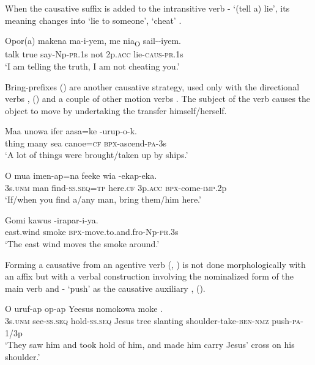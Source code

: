 When the causative suffix is added to the intransitive verb - `(tell a) lie', its meaning changes into `lie to someone', `cheat' . 

\ea%
\label{ex:3:x448}
\gll Opor(a) makena ma-i-yem, me {\ob}nia{\cb}\textsubscript{O} sail--iyem. \\
talk true say-Np-\textsc{pr}.1s not 2p.\textsc{acc} lie-\textsc{caus}-\textsc{pr}.1s\\
\glt`I am telling the truth, I am not cheating you.'
\z

Bring-prefixes () are another causative strategy, used only with the directional verbs ,  () and a couple of other motion verbs . The subject of the verb causes the object to move by undertaking the transfer himself/herself.

\ea%
\label{ex:3:x999}
\gll Maa unowa ifer aasa=ke -urup-o-k. \\
thing many sea canoe=\textsc{cf} \textsc{bpx}-ascend-\textsc{pa}-3s\\
\glt`A lot of things were brought/taken up by ships.'
\z

\ea%
\label{ex:3:x1001}
\gll O mua imen-ap=na feeke wia -ekap-eka. \\
3s.\textsc{unm} man find-\textsc{ss}.\textsc{seq}=\textsc{tp} here.\textsc{cf} 3p.\textsc{acc} \textsc{bpx}-come-\textsc{imp}.2p\\
\glt`If/when you find a/any man, bring them/him here.'
\z

\ea%
\label{ex:3:x1000}
\gll Gomi kawus -irapar-i-ya. \\
east.wind smoke \textsc{bpx}-move.to.and.fro-Np-\textsc{pr}.3s\\
\glt`The east wind moves the smoke around.'
\z

Forming a causative from an agentive verb (, \citealt[112]{Talmy2007}) is not done morphologically with an affix but  with a verbal construction involving the nominalized form of the main verb and - `push' as the causative auxiliary ,  (). 

\ea%
\label{ex:3:x1003}
\gll O uruf-ap op-ap Yeesus nomokowa moke  .\\
3s.\textsc{unm} see-\textsc{ss}.\textsc{seq} hold-\textsc{ss}.\textsc{seq} Jesus tree slanting shoulder-take-\textsc{ben}-\textsc{nmz} push-\textsc{pa}-1/3p\\
\glt`They saw him and took hold of him, and made him carry Jesus' cross on his shoulder.'
\z

